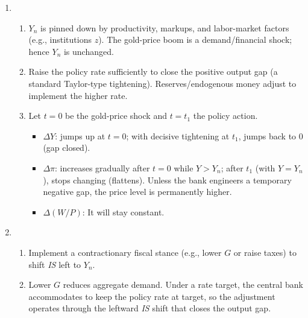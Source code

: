 \documentclass[12pt]{article}
\begin{document}
\begin{enumerate}[label=(\arabic*)]
    \item
      \begin{enumerate}[label=\alph*.]
        \item $Y_n$ is pinned down by productivity, markups, and labor-market factors (e.g., institutions $z$). The gold-price boom is a demand/financial shock; hence $Y_n$ is unchanged.
        \item Raise the policy rate sufficiently to close the positive output gap (a standard Taylor-type tightening). Reserves/endogenous money adjust to implement the higher rate.
        \item Let $t=0$ be the gold-price shock and $t=t_1$ the policy action.
          \begin{itemize}
            \item $\Delta Y$: jumps up at $t=0$; with decisive tightening at $t_1$, jumps back to $0$ (gap closed).
            \item $\Delta \pi$: increases gradually after $t=0$ while $Y>Y_n$; after $t_1$ (with $Y=Y_n$), stops changing (flattens). Unless the bank engineers a temporary negative gap, the price level is permanently higher.
            \item $\Delta(W/P)$: It will stay constant.
          \end{itemize}
      \end{enumerate}
    
    \item
      \begin{enumerate}[label=\alph*.]
        \item Implement a contractionary fiscal stance (e.g., lower $G$ or raise taxes) to shift \emph{IS} left to $Y_n$.
        \item Lower $G$ reduces aggregate demand. Under a rate target, the central bank accommodates to keep the policy rate at target, so the adjustment operates through the leftward \emph{IS} shift that closes the output gap.
      \end{enumerate}
    
\end{enumerate}
    
\end{document}
